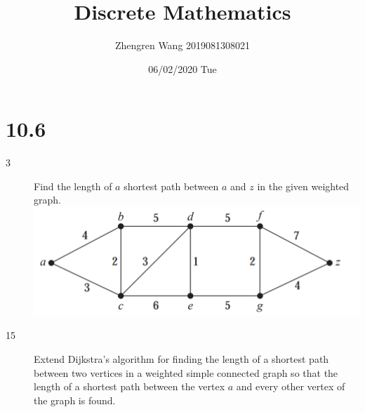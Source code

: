 \documentclass[UTF8]{article}
\title{Discrete Mathematics}
\author{Zhengren Wang 2019081308021}
\date{06/02/2020 Tue}
\begin{document}
\maketitle 

\part{10.6}
\begin{description}
    \item[3]Find the length of $a$ shortest path between $a$ and $z$ in the given weighted graph. \\
        \includegraphics[scale=0.3]{../imgs/10_6_3.png}


    \item[15]Extend Dijkstra’s algorithm for finding the length of a shortest path between two vertices in a weighted simple connected graph so that the length of a shortest path between the vertex $a$ and every other vertex of the graph is found.


\end{description}
\end{document}
